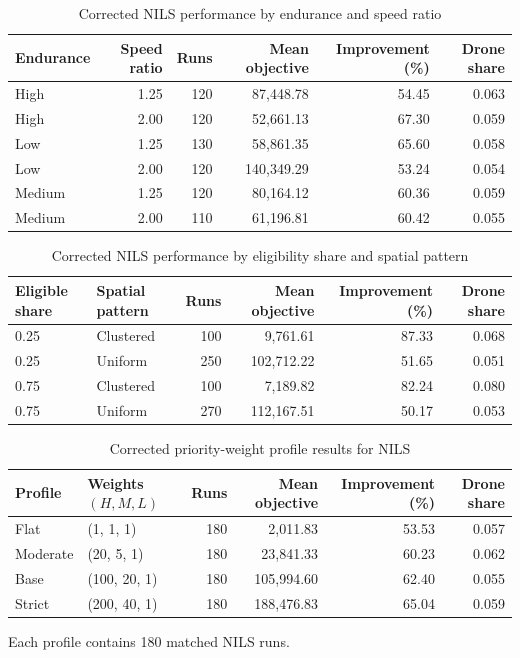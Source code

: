 \begin{table}[htbp]
\centering
\caption{Corrected NILS performance by endurance and speed ratio}
\label{tab:endurance_speed_corrected}
\small
\begin{tabular}{lrrrrr}
\toprule
Endurance & Speed ratio & Runs & Mean objective & Improvement (\%) & Drone share \\
\midrule
High & 1.25 & 120 & 87,448.78 & 54.45 & 0.063 \\
High & 2.00 & 120 & 52,661.13 & 67.30 & 0.059 \\
Low & 1.25 & 130 & 58,861.35 & 65.60 & 0.058 \\
Low & 2.00 & 120 & 140,349.29 & 53.24 & 0.054 \\
Medium & 1.25 & 120 & 80,164.12 & 60.36 & 0.059 \\
Medium & 2.00 & 110 & 61,196.81 & 60.42 & 0.055 \\
\bottomrule
\end{tabular}
\end{table}

\begin{table}[htbp]
\centering
\caption{Corrected NILS performance by eligibility share and spatial pattern}
\label{tab:eligibility_spatial_corrected}
\small
\begin{tabular}{l l r r r r}
\toprule
Eligible share & Spatial pattern & Runs & Mean objective & Improvement (\%) & Drone share \\
\midrule
0.25 & Clustered & 100 & 9,761.61 & 87.33 & 0.068 \\
0.25 & Uniform & 250 & 102,712.22 & 51.65 & 0.051 \\
0.75 & Clustered & 100 & 7,189.82 & 82.24 & 0.080 \\
0.75 & Uniform & 270 & 112,167.51 & 50.17 & 0.053 \\
\bottomrule
\end{tabular}
\end{table}

\begin{table}[htbp]
\centering
\caption{Corrected priority-weight profile results for NILS}
\label{tab:priority_profiles_corrected}
\small
\begin{tabular}{l l r r r r}
\toprule
Profile & Weights $(H,M,L)$ & Runs & Mean objective & Improvement (\%) & Drone share \\
\midrule
Flat & (1, 1, 1) & 180 & 2,011.83 & 53.53 & 0.057 \\
Moderate & (20, 5, 1) & 180 & 23,841.33 & 60.23 & 0.062 \\
Base & (100, 20, 1) & 180 & 105,994.60 & 62.40 & 0.055 \\
Strict & (200, 40, 1) & 180 & 188,476.83 & 65.04 & 0.059 \\
\bottomrule
\end{tabular}
\begin{flushleft}\footnotesize Each profile contains 180 matched NILS runs.\end{flushleft}
\end{table}

